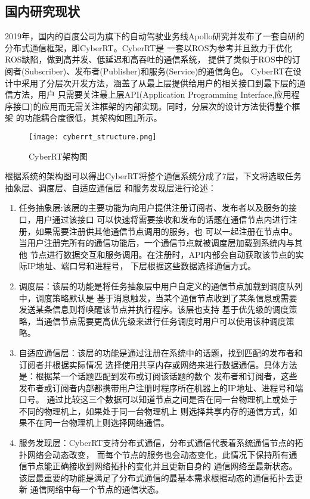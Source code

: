 \subsection{国内研究现状}
2019年，国内的百度公司为旗下的自动驾驶业务线Apollo研究并发布了一套自研的分布式通信框架，即CyberRT。CyberRT是
一套以ROS为参考并且致力于优化ROS缺陷，做到高并发、低延迟和高吞吐的通信系统，
提供了类似于ROS中的订阅者(Subscriber)、发布者(Publisher)和服务(Service)的通信角色。
CyberRT在设计中采用了分层次开发方法，涵盖了从最上层提供给用户的相关接口到最下层的通信方法，用户
只需要关注最上层API(Application Programming Interface,应用程序接口)的应用而无需关注框架的内部实现。同时，分层次的设计方法使得整个框架
的功能耦合度很低，其架构如图\ref{cyberrt_structure}所示\cite{cyberrt}。
\begin{figure}[H]
  \centering
  \texttt{[image: cyberrt\_structure.png]}
  \caption{CyberRT架构图}
  \label{cyberrt_structure}
\end{figure}
根据系统的架构图可以得出CyberRT将整个通信系统分成了7层，下文将选取任务抽象层、调度层、自适应通信层
和服务发现层进行论述：
\begin{enumerate}
  \item 任务抽象层:该层的主要功能为向用户提供注册订阅者、发布者以及服务的接口，用户通过该接口
  可以快速将需要接收和发布的话题在通信节点内进行注册，如果需要注册供其他通信节点调用的服务，也
  可以一起注册在节点中。当用户注册完所有的通信功能后，一个通信节点就被调度层加载到系统内与其他
  节点进行数据交互和服务调用。在注册时，API内部会自动获取该节点的实际IP地址、端口号和进程号，
  下层根据这些数据选择通信方式。
  \item 调度层：该层的功能是将任务抽象层中用户自定义的通信节点加载到调度队列中，调度策略默认是
  基于消息触发，当某个通信节点收到了某条信息或需要发送某条信息则将唤醒该节点并执行程序。该层也支持
  基于优先级的调度策略，当通信节点需要更高优先级来进行任务调度时用户可以使用该种调度策略。
  \item 自适应通信层：该层的功能是通过注册在系统中的话题，找到匹配的发布者和订阅者并根据实际情况
  选择使用共享内存或网络来进行数据通信。具体方法是：根据某一个话题匹配到发布或订阅该话题的数个
  发布者和订阅者，这些发布者或订阅者内部都携带用户注册时程序所在机器上的IP地址、进程号和端口号。
  通过比较这三个数据可以知道节点之间是否在同一台物理机上或处于不同的物理机上，如果处于同一台物理机上
  则选择共享内存的通信方式，如果不在同一台物理机上则选择网络通信。
  \item 服务发现层：CyberRT支持分布式通信，分布式通信代表着系统通信节点的拓扑网络会动态改变，
  而每个节点的服务也会动态变化，此情况下保持所有通信节点能正确接收到网络拓扑的变化并且更新自身的
  通信网络至最新状态。该层最重要的功能是满足了分布式通信的最基本需求根据动态的通信拓扑去更新
  通信网络中每一个节点的通信状态。
\end{enumerate}
